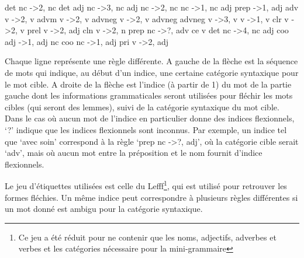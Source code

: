 {\begin{framed}
det nc -\textgreater 2, nc\newline
det adj nc -\textgreater 3, nc\newline
adj nc -\textgreater 2, nc\newline
nc -\textgreater 1, nc\newline
adj prep -\textgreater 1, adj\newline
adv v -\textgreater 2, v\newline
advm v -\textgreater 2, v\newline
advneg v -\textgreater 2, v\newline
advneg advneg v -\textgreater 3, v\newline
v -\textgreater 1, v\newline
clr v -\textgreater 2, v\newline
prel v -\textgreater 2, adj \newline
cln v -\textgreater 2, n\newline
prep nc -\textgreater ?, adv\newline
ce v det nc -\textgreater 4, nc\newline
adj coo adj -\textgreater 1, adj\newline
nc coo nc -\textgreater 1, adj\newline
pri v -\textgreater 2, adj
\end{framed}

Chaque ligne représente une règle différente. A gauche de la flèche est la séquence de mots qui indique, au début d'un indice, une certaine catégorie syntaxique pour le mot cible. A droite de la flèche est l'indice (à partir de 1) du mot de la partie gauche dont les informations grammaticales seront utilisées pour fléchir les mots cibles (qui seront des lemmes), suivi de la catégorie syntaxique du mot cible. Dans le cas où aucun mot de l'indice en particulier donne des indices flexionnels, \lq{?}\rq{} indique que les indices flexionnels sont inconnus. Par exemple, un indice tel que \lq{avec soin}\rq{} correspond à la règle \lq{prep nc -\textgreater ?, adj}\rq{}, où la catégorie cible serait \lq{adv}\rq{}, mais où aucun mot entre la préposition et le nom fournit d'indice flexionnels.

Le jeu d'étiquettes utilisées est celle du Lefff\footnote{Ce jeu a été réduit pour ne contenir que les noms, adjectifs, adverbes et verbes et les catégories nécessaire pour la mini-grammaire}, qui est utilisé pour retrouver les formes fléchies. Un même indice peut correspondre à plusieurs règles différentes si un mot donné est ambigu pour la catégorie syntaxique.

}
